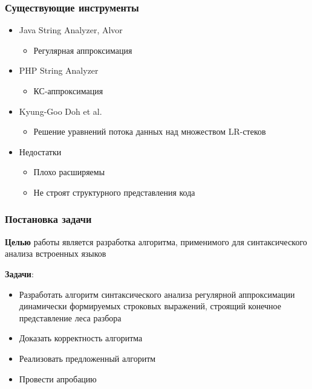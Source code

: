 \documentclass{beamer}
\begin{document}
\begin{frame}
  \transwipe[direction=90]
  \frametitle{Существующие инструменты}
  \begin{itemize}
    \item Java String Analyzer, Alvor
    \begin{itemize}
      \item Регулярная аппроксимация
    \end{itemize}
    \item PHP String Analyzer
    \begin{itemize}
      \item КС-аппроксимация
    \end{itemize}
    \item Kyung-Goo Doh et al.
    \begin{itemize}
      \item Решение уравнений потока данных над множеством LR-стеков
    \end{itemize}
  \end{itemize}
  
  \begin{itemize}
    \item Недостатки
    \begin{itemize}
      \item Плохо расширяемы
      \item Не строят структурного представления кода
    \end{itemize}
  \end{itemize}
\end{frame}

\begin{frame}
  \transwipe[direction=90]
  \frametitle{Постановка задачи}
  \textbf{Целью} работы является разработка алгоритма, применимого для синтаксического 
анализа встроенных языков
  
  \textbf{Задачи}:
  \begin{itemize}
    \item Разработать алгоритм синтаксического анализа регулярной аппроксимации динамически формируемых строковых выражений, строящий конечное представление леса разбора
    \item Доказать корректность алгоритма
    \item Реализовать предложенный алгоритм
    \item Провести апробацию
  \end{itemize}
\end{frame}
            
\end{document}
